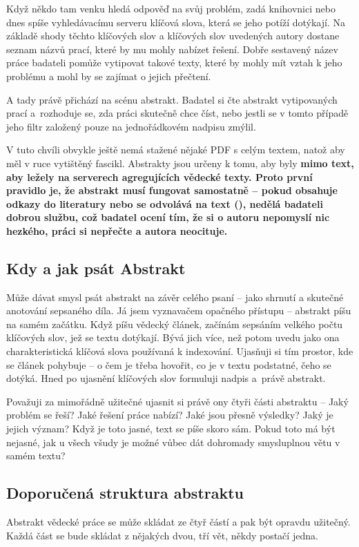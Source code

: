 Když někdo tam venku hledá odpověď na svůj problém, zadá knihovnici nebo dnes spíše vyhledávacímu serveru klíčová slova, která se jeho potíží dotýkají. Na základě shody těchto klíčových slov a klíčových slov uvedených autory dostane seznam názvů prací, které by mu mohly nabízet řešení. Dobře sestavený název práce badateli pomůže vytipovat takové texty, které by mohly mít vztah k jeho problému a mohl by se zajímat o jejich přečtení.

A tady právě přichází na scénu abstrakt. Badatel si čte abstrakt vytipovaných prací a~rozhoduje se, zda práci skutečně chce číst, nebo jestli se v tomto případě jeho filtr založený pouze na jednořádkovém nadpisu zmýlil.

V tuto chvíli obvykle ještě nemá stažené nějaké PDF s celým textem, natož aby měl v ruce vytištěný fascikl. Abstrakty jsou určeny k tomu, aby byly \bf mimo text\rm , aby ležely na serverech agregujících vědecké texty. Proto první pravidlo je, že abstrakt musí fungovat samostatně -- pokud obsahuje odkazy do literatury nebo se odvolává na text (), nedělá badateli dobrou službu, což badatel ocení tím, že si o autoru nepomyslí nic hezkého, práci si nepřečte a autora neocituje.

\subsection*{Kdy a jak psát Abstrakt}
Může dávat smysl psát abstrakt na závěr celého psaní -- jako shrnutí a skutečné anotování sepsaného díla. Já jsem vyznavačem opačného přístupu -- abstrakt píšu na samém začátku. Když píšu vědecký článek, začínám sepsáním velkého počtu klíčových slov, jež se textu dotýkají. Bývá jich více, než potom uvedu jako ona charakteristická klíčová slova používaná k indexování. Ujasňuji si tím prostor, kde se článek pohybuje -- o čem je třeba hovořit, co je v textu podstatné, čeho se dotýká. Hned po ujasnění klíčových slov formuluji nadpis a~právě abstrakt.

Považuji za mimořádně užitečné ujasnit si právě ony čtyři části abstraktu -- Jaký problém se řeší? Jaké řešení práce nabízí? Jaké jsou přesně výsledky? Jaký je jejich význam? Když je toto jasné, text se píše skoro sám. Pokud toto má být nejasné, jak u všech všudy je možné vůbec dát dohromady smysluplnou větu v samém textu?

\subsection*{Doporučená struktura abstraktu}
Abstrakt vědecké práce se může skládat ze čtyř částí a pak být opravdu užitečný. Každá část se bude skládat z nějakých dvou, tří vět, někdy postačí jedna.

